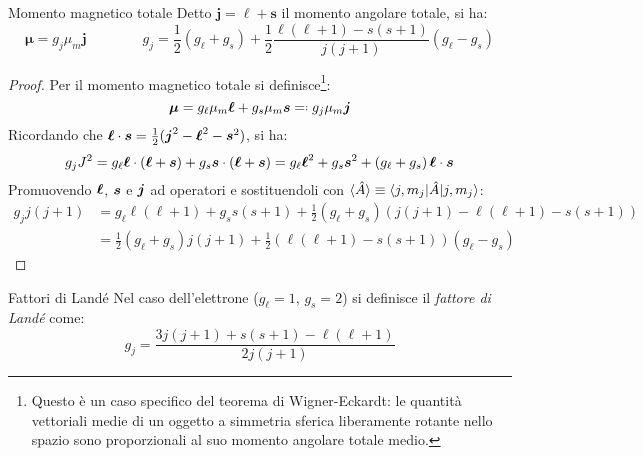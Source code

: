 \begin{proposition}{Momento magnetico totale}{}
	Detto $ \boldsymbol{j} = \boldsymbol{\ell} + \boldsymbol{s} $ il momento angolare totale, si ha:
	\begin{equation}
		\boldsymbol{\mu} = g_j \mu_m \boldsymbol{j}
		\qquad \qquad
		g_j = \frac{1}{2} \left( g_\ell + g_s \right) + \frac{1}{2} \frac{\ell (\ell + 1) - s (s + 1)}{j (j + 1)} \left( g_\ell - g_s \right)
		\label{eq:1.12}
	\end{equation}

	\tcblower

	\begin{proof}
		Per il momento magnetico totale si definisce\footnote{Questo è un caso specifico del teorema di Wigner-Eckardt: le quantità vettoriali medie di un oggetto a simmetria sferica liberamente rotante nello spazio sono proporzionali al suo momento angolare totale medio.}:
		\begin{equation*}
			\bs{\mu} = g_\ell \mu_m \bs{\ell} + g_s \mu_m \bs{s} \eqdef g_j \mu_m \bs{j}
		\end{equation*}
		Ricordando che $ \boldsymbol{\ell} \cdot \boldsymbol{s} = \frac{1}{2} ( \boldsymbol{j}^2 - \boldsymbol{\ell}^2 - \boldsymbol{s}^2 ) $, si ha:
		\begin{equation*}
			g_j J^2 = g_\ell \boldsymbol{\ell} \cdot \left( \boldsymbol{\ell} + \boldsymbol{s} \right) + g_s \boldsymbol{s} \cdot \left( \boldsymbol{\ell} + \boldsymbol{s} \right) = g_\ell \boldsymbol{\ell}^2 + g_s \boldsymbol{s}^2 + \left( g_\ell + g_s \right) \boldsymbol{\ell} \cdot \boldsymbol{s}
		\end{equation*}
		Promuovendo $ \boldsymbol{\ell} $, $ \boldsymbol{s} $ e $ \boldsymbol{j} $ ad operatori e sostituendoli con $ \braket{\hat{A}} \equiv \braket{j,m_j | \hat{A} | j,m_j} $:
		\begin{equation*}
			\begin{split}
				g_j j (j + 1)
				&= g_\ell \ell (\ell + 1) + g_s s (s + 1) + \frac{1}{2} \left( g_\ell + g_s \right) \left( j (j + 1) - \ell (\ell + 1) - s (s + 1) \right) \\
				&= \frac{1}{2} \left( g_\ell + g_s \right) j (j + 1) + \frac{1}{2} \left( \ell (\ell + 1) - s (s + 1) \right) \left( g_\ell - g_s \right)
			\end{split}
		\end{equation*}
	\end{proof}
\end{proposition}

\begin{definition}{Fattori di Landé}{}
	Nel caso dell'elettrone ($ g_\ell = 1 $, $ g_s = 2 $) si definisce il \textit{fattore di Landé} come:
	\begin{equation}
		g_j = \frac{3 j (j + 1) + s (s + 1) - \ell (\ell + 1)}{2 j (j + 1)}
		\label{eq:1.13}
	\end{equation}
\end{definition}

